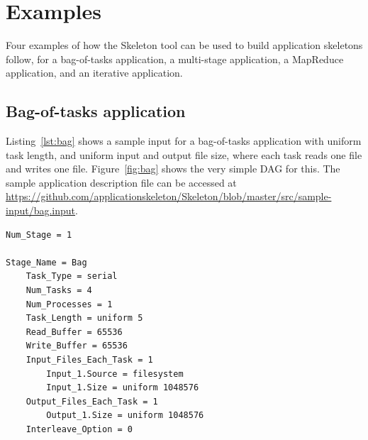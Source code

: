 \documentclass[10pt,a4paper]{article}
\begin{document}
\section{Examples}

Four examples of how the Skeleton tool can be used to build application skeletons follow, for a bag-of-tasks application, a multi-stage application, a MapReduce application, and an iterative application.  


\subsection{Bag-of-tasks application}

Listing~\ref{lst:bag} shows a sample input for a bag-of-tasks application with uniform task length, and uniform input and output file size, where each task reads one file and writes one file. Figure~\ref{fig:bag} shows the very simple DAG for this. The sample application description file can be accessed at \url{https://github.com/applicationskeleton/Skeleton/blob/master/src/sample-input/bag.input}.

\begin{lstlisting}[caption=Sample input for a bag-of-tasks application, label=lst:bag, linewidth=1.0\textwidth, xleftmargin=2.5ex]
Num_Stage = 1

Stage_Name = Bag
    Task_Type = serial
    Num_Tasks = 4  
    Num_Processes = 1
    Task_Length = uniform 5
    Read_Buffer = 65536
    Write_Buffer = 65536
    Input_Files_Each_Task = 1
    	Input_1.Source = filesystem
    	Input_1.Size = uniform 1048576
    Output_Files_Each_Task = 1
        Output_1.Size = uniform 1048576
    Interleave_Option = 0    

\end{lstlisting}
\end{document}
